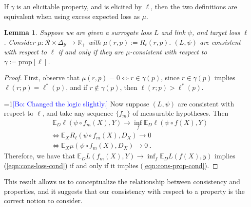\documentclass{article}
\newcommand{\Comments}{1}
\newcommand{\mynote}[2]{\ifnum\Comments=1\textcolor{#1}{#2}\fi}
\newcommand{\bo}[1]{\mynote{blue}{[Bo: #1]}}
\newcommand{\reals}{\mathbb{R}}
\newcommand{\simplex}{\Delta_\Y}
\newcommand{\prop}[1]{\mathrm{prop}[#1]}
\newcommand{\propdis}{\mu}
\newcommand{\E}{\mathbb{E}}
\newcommand{\R}{\mathcal{R}}
\newcommand{\Y}{\mathcal{Y}}
\newcommand{\risk}[1]{#1^*}
\newtheorem{lemma}{Lemma}
\begin{document}


If $\gamma$ is an elicitable property, and is elicited by $\ell$, then the two definitions are equivalent when using excess expected loss as $\propdis$.
\begin{lemma}\label{lem:consistent-loss-implies-prop}
	Suppose we are given a surrogate loss $L$ and link $\psi$, and target loss $\ell$.
	Consider $\propdis: \R \times \simplex \to \reals_+$ with $\mu(r,p) := R_\ell(r,p)$.
	$(L, \psi)$ are consistent with respect to $\ell$ if and only if they are $\propdis$-consistent with respect to $\gamma := \prop{\ell}$.
\end{lemma}
\begin{proof}
	First, observe that $\propdis(r,p) = 0 \iff r \in \gamma(p)$, since $r \in \gamma(p)$ implies $\ell(r;p) = \risk{\ell}(p)$, and if $r \not \in \gamma(p)$, then $\ell(r;p) > \risk{\ell}(p)$.
	
	\bo{Changed the logic slightly.}
	Now suppose $(L, \psi)$ are consistent with respect to $\ell$, and take any sequence $\{f_m\}$ of measurable hypotheses.
        Then
        \begin{align}
	  &\; \E_D \ell(\psi \circ f_m(X), Y)\to \inf_f \E_D \ell(\psi \circ f(X), Y)   \label{eqn:cons-loss-cond} \\
	  &\iff \E_X R_\ell(\psi \circ f_m(X), D_X) \to 0                               \nonumber  \\
	  &\iff \E_X \propdis(\psi \circ f_m(X), D_X) \to 0~.~                          \label{eqn:cons-prop-cond}
	\end{align}
        Therefore, we have that $\mathbb{E}_D L(f_m(X),Y) \to \inf_f \mathbb{E}_D L(f(X),y)$ implies (\ref{eqn:cons-loss-cond}) if and only if it implies (\ref{eqn:cons-prop-cond}).
\end{proof}

This result allows us to conceptualize the relationship between consistency and properties, and it suggests that our consistency with respect to a property is the correct notion to consider.
\end{document}
